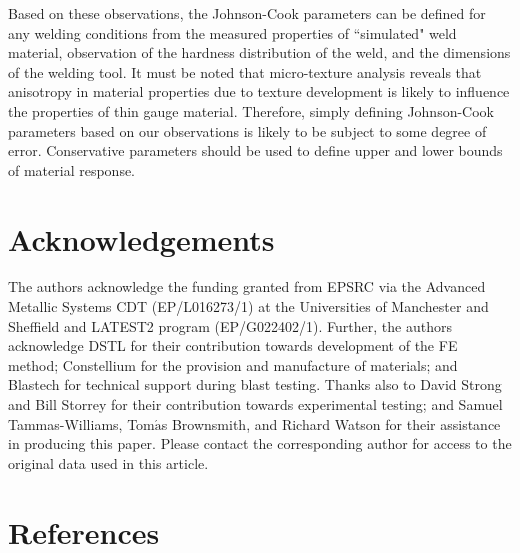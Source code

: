 	Based on these observations, the Johnson-Cook parameters can be defined for any welding conditions from the measured properties of ``simulated" weld material, observation of the hardness distribution of the weld, and the dimensions of the welding tool. It must be noted that micro-texture analysis reveals that anisotropy in material properties due to texture development is likely to influence the properties of thin gauge material. Therefore, simply defining Johnson-Cook parameters based on our observations is likely to be subject to some degree of error. Conservative parameters should be used to define upper and lower bounds of material response.
	
	
	\section*{Acknowledgements}
	\label{Acknowledgements}
	The authors acknowledge the funding granted from EPSRC via the Advanced Metallic Systems CDT (EP/L016273/1) at the Universities of Manchester and Sheffield and LATEST2 program (EP/G022402/1). Further, the authors acknowledge DSTL for their contribution towards development of the FE method; Constellium for the provision and manufacture of materials; and Blastech for technical support during blast testing. Thanks also to David Strong and Bill Storrey for their contribution towards experimental testing; and Samuel Tammas-Williams, Tom$\acute{\text{a}}$s Brownsmith, and Richard Watson for their assistance in producing this paper. Please contact the corresponding author for access to the original data used in this article.
	
	
	\section*{References}
	 
	
	
	
	
	
	
	

\endinput
